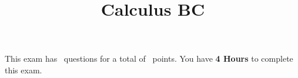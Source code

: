 

\usepackage{color}
\lstset{numbers=left}


\printanswers

\title{Calculus BC}
\maketitle



\begin{center}
    This exam has \numquestions\ questions for a total of \numpoints\
    points. You have {\bf 4 Hours} to complete this exam.
\end{center}



